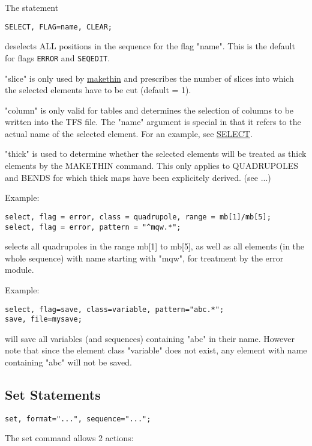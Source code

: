 The statement 
\begin{verbatim}
SELECT, FLAG=name, CLEAR;
\end{verbatim} 
deselects ALL positions in the sequence for the flag "name". This is the default
for flags {\tt ERROR} and {\tt SEQEDIT}.

"slice" is only used by \href{../makethin/makethin.html}{makethin} and
prescribes the number of slices into which the selected elements have to
be cut (default = 1).  

"column" is only valid for tables and determines the selection of columns
to be written into the TFS file. The "name" argument is special in that
it refers to the actual name of the selected element. For an example,
see \href{../Introduction/select.html}{SELECT}.  

"thick" is used to determine whether the selected elements will be
treated as thick elements by the MAKETHIN command. This only applies to
QUADRUPOLES and BENDS for which thick maps have been explicitely
derived. (see ...) 

Example: 
\begin{verbatim}
select, flag = error, class = quadrupole, range = mb[1]/mb[5];
select, flag = error, pattern = "^mqw.*";
\end{verbatim} 
selects all quadrupoles in the range mb[1] to mb[5], as well as all
elements (in the whole sequence) with name starting with "mqw", for 
treatment by the error module.  

Example:  
\begin{verbatim}
select, flag=save, class=variable, pattern="abc.*";
save, file=mysave;
\end{verbatim} 
will save all variables (and sequences) containing "abc" in their name.
However note that since the element class "variable" does not exist, any
element with name containing "abc" will not be saved. 


\subsection{Set Statements}
\begin{verbatim}
set, format="...", sequence="...";
\end{verbatim} 

The set command allows 2 actions: 

